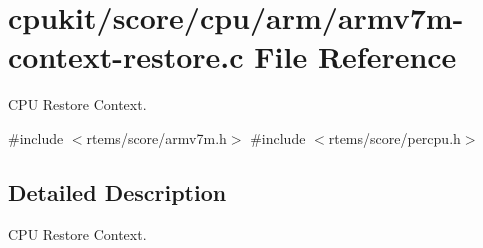 \hypertarget{armv7m-context-restore_8c}{}\section{cpukit/score/cpu/arm/armv7m-\/context-\/restore.c File Reference}
\label{armv7m-context-restore_8c}


C\+PU Restore Context.  


{\ttfamily \#include $<$rtems/score/armv7m.\+h$>$}\newline
{\ttfamily \#include $<$rtems/score/percpu.\+h$>$}\newline


\subsection{Detailed Description}
C\+PU Restore Context. 

